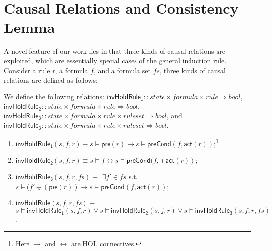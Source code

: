 \documentclass[final]{IEEEtran}
\newlength{\fminilength}
\newenvironment{fmini}[1][\linewidth]
  {\setlength{\fminilength}{#1\fboxsep-2\fboxrule}%
   \vspace{2ex}\noindent\begin{lrbox}{\fminibox}\begin{minipage}{\fminilength}%
   \mbox{ }\hfill\vspace{-2.5ex}}%
  {\end{minipage}\end{lrbox}\vspace{1ex}\hspace{0ex}%
   \framebox{\usebox{\fminibox}}}
\newenvironment{specification}
{\noindent\scriptsize
\tt\begin{fmini}\begin{tabbing}X\=X12345\=XXXX\=XXXX\=XXXX\=XXXX\=XXXX
\=\+\kill} {\end{tabbing}\normalfont\end{fmini}}
\def \andc {\barwedge }
\begin{document}
\section{Causal Relations and Consistency Lemma} \label{sec:causal_rel}
\vspace{-0.3cm}
A novel feature of our work lies in that three kinds of causal
relations are exploited, which are essentially special cases of the
general induction rule.  Consider a rule $r$, a formula $f$, and a formula set $fs$, three
 kinds of causal relations are defined as follows:
 \begin{definition}
We define the following relations: $\mathsf{invHoldRule_1}::state \times formula\times rule \Rightarrow bool$, $\mathsf{invHoldRule_2}::state\times  formula\times rule  \Rightarrow bool$,  $\mathsf{invHoldRule_3}::state \times formula\times rule \times rule set\Rightarrow bool$, and $\mathsf{invHoldRule_3}::state \times formula\times rule \times rule set\Rightarrow bool$.
\vspace{-0.2cm}
\begin{enumerate}
\item $\mathsf{invHoldRule_1} (s,f,r) \equiv $$s \models \mathsf{pre}(r) \longrightarrow s \models \mathsf{preCond}(f ,\mathsf{act}(r))$;\footnote{Here  $\longrightarrow$ and $\longleftrightarrow$ are HOL connectives.  }
\item $\mathsf{invHoldRule_2}(s,f,r) \equiv  $$s \models f \longleftrightarrow s \models \mathsf{preCond}( f,(\mathsf{act}( r))$;
\item $\mathsf{invHoldRule_3}(s,f,r,fs) \equiv$  $\exists f' \in fs$ s.t.
$s \models ( f' \andc (\mathsf{pre}(r))  \longrightarrow s \models \mathsf{preCond}(f ,\mathsf{act}(r))$;
\item $\mathsf{invHoldRule}(s,f,r, fs) \equiv$   $s \models\mathsf{invHoldRule_1}(s,f,r) \vee s\models\mathsf{invHoldRule_2}(s,f,r) \vee s\models \mathsf{invHoldRule_3}(s,f,r,fs)$.
\end{enumerate}
\end{definition}
\vspace{-0.2cm}
\end{document}
